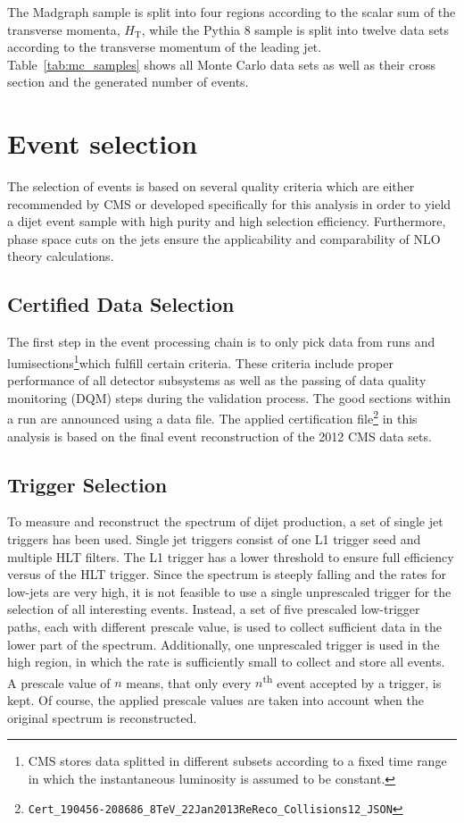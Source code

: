 The Madgraph sample is split into four regions according to the scalar sum of
the transverse momenta, $H_{\mathrm{T}}$, while the Pythia 8 sample is split
into twelve data sets according to the transverse momentum of the leading jet.
Table~\ref{tab:mc_samples} shows all Monte Carlo data sets as well as their cross
section and the generated number of events.

\section{Event selection}
\label{sec:event_selection}

The selection of events is based on several quality criteria which are either
recommended by CMS or developed specifically for this analysis in order to yield
a dijet event sample with high purity and high selection efficiency.
Furthermore, phase space cuts on the jets ensure the applicability and
comparability of NLO theory calculations.

\subsection{Certified Data Selection}

The first step in the event processing chain is to only pick data from runs and
lumisections\footnote{CMS stores data splitted in different subsets according to
    a fixed time range in which the instantaneous luminosity is assumed to be
constant.}which fulfill certain criteria. These criteria include
proper performance of all detector subsystems as well as the passing of data
quality monitoring (DQM) steps during the validation process. The good
sections within a run are announced using a data file. The applied certification
file\footnote{\texttt{Cert\_190456-208686\_8TeV\_22Jan2013ReReco\_Collisions12\_JSON}}
in this analysis is based on the final event reconstruction of the 2012 CMS data
sets.

\subsection{Trigger Selection}

To measure and reconstruct the \ptavg spectrum of dijet production, a set of
single jet triggers has been used. Single jet triggers consist of one L1 trigger
seed and multiple HLT filters. The L1 trigger has a lower threshold to ensure
full efficiency versus \pt of the HLT trigger. Since the \pt spectrum is steeply
falling and the rates for low-\pt jets are very high, it is not feasible to use
a single unprescaled trigger for the selection of all interesting events.
Instead, a set of five prescaled low-\pt trigger paths, each with different
prescale value, is used to collect sufficient data in the lower part of the \pt
spectrum.  Additionally, one unprescaled trigger is used in the high \pt region, in
which the rate is sufficiently small to collect and store all
events. A prescale value of $n$ means, that only every $n$\textsuperscript{th} event accepted by
a trigger, is kept. Of course, the applied prescale values are taken into
account when the original spectrum is reconstructed. 

